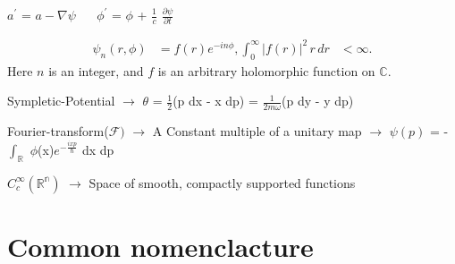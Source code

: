 \documentclass[a4paper, 10pt, onepage]{elegantbook}
\begin{document}
\begin{note}
$a^{\prime}$ = $a - \nabla \psi$ $\quad$  $\phi^{\prime}$ = $\phi$ + $\frac{1}{c}$ $\frac{\partial \psi}{\partial t}$

\[
\begin{aligned}
\psi_n(r,\phi) &= f(r)e^{-in\phi},
\int_0^\infty |f(r)|^2\,r\,dr &< \infty.
\end{aligned}
\]
Here \(n\) is an integer, and \(f\) is an arbitrary
holomorphic function on \(\mathbb{C}\).

 
Sympletic-Potential $\longrightarrow$ $\theta$ = $\frac{1}{2}$(p dx - x dp) = $\frac{1}{{2m} 
\omega}$(p dy - y dp)
  
Fourier-transform($\mathcal{F})$ $\longrightarrow$ A Constant multiple of a unitary map 
$\longrightarrow$ $\psi(p)$ = - $\int_\mathbb R$ $\phi$(x)$e^{- \frac{{ixp}}{\hbar}}$ dx dp
  
$C_c^{\infty}(\mathbb {R^n})$ $\longrightarrow$ Space of smooth, compactly supported functions
\end{note}

\section{\textbf{Common nomenclacture}}
\end{document}
